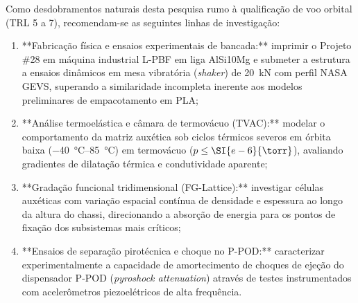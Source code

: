 Como desdobramentos naturais desta pesquisa rumo à qualificação de voo orbital (TRL 5 a 7), recomendam-se as seguintes linhas de investigação:
\begin{enumerate}
  \item **Fabricação física e ensaios experimentais de bancada:** imprimir o Projeto \#28 em máquina industrial L-PBF em liga AlSi10Mg e submeter a estrutura a ensaios dinâmicos em mesa vibratória (\textit{shaker}) de \SI{20}{\kilo\newton} com perfil NASA GEVS, superando a similaridade incompleta inerente aos modelos preliminares de empacotamento em PLA;
  \item **Análise termoelástica e câmara de termovácuo (TVAC):** modelar o comportamento da matriz auxética sob ciclos térmicos severos em órbita baixa (\SIrange{-40}{+85}{\celsius}) em termovácuo ($p \le \SI{e-6}{\torr}$), avaliando gradientes de dilatação térmica e condutividade aparente;
  \item **Gradação funcional tridimensional (FG-Lattice):** investigar células auxéticas com variação espacial contínua de densidade e espessura ao longo da altura do chassi, direcionando a absorção de energia para os pontos de fixação dos subsistemas mais críticos;
  \item **Ensaios de separação pirotécnica e choque no P-POD:** caracterizar experimentalmente a capacidade de amortecimento de choques de ejeção do dispensador P-POD (\textit{pyroshock attenuation}) através de testes instrumentados com acelerômetros piezoelétricos de alta frequência.
\end{enumerate}
